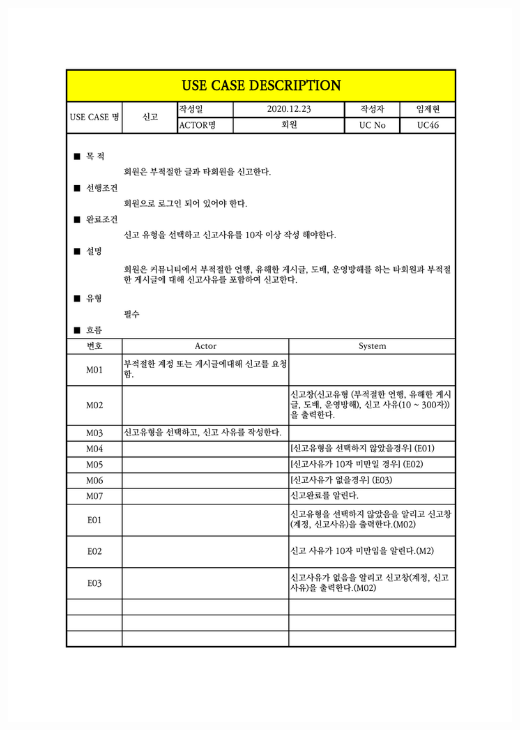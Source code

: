 {{{{{{{{{{{{{{{{{{{{{{{{{{{{{{{{{{{{{{{{{{{{{{{{{\includegraphics[width=1.1\textwidth]{./Figure/Design/Display/usecase/046.pdf} \\
}}}}}}}}}}}}}}}}}}}}}}}}}}}}}}}}}}}}}}}}}}}}}}}}}
